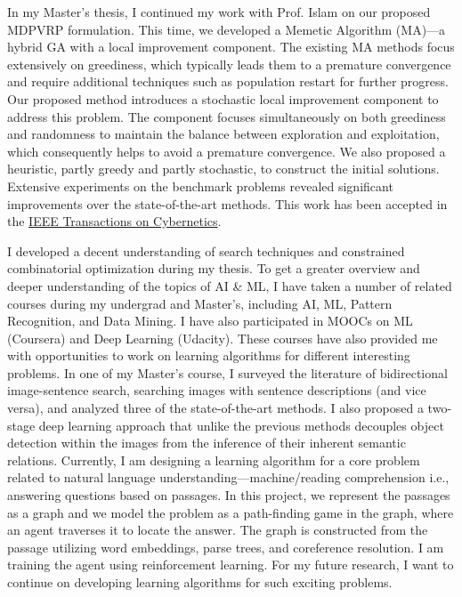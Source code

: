 \documentclass[12pt]{article}
\begin{document}
In my Master's thesis, I continued my work with Prof. Islam on our proposed MDPVRP formulation. This time, we developed a Memetic Algorithm (MA)---a hybrid GA with a local improvement component. The existing MA methods focus extensively on greediness, which typically leads them to a premature convergence and require additional techniques such as population restart for further progress. Our proposed method introduces a stochastic local improvement component to address this problem. The component focuses simultaneously on both greediness and randomness to maintain the balance between exploration and exploitation, which consequently helps to avoid a premature convergence. We also proposed a heuristic, partly greedy and partly stochastic, to construct the initial solutions. Extensive experiments on the benchmark problems revealed significant improvements over the state-of-the-art methods. This work has been accepted in the \href{http://ieeexplore.ieee.org/document/7835722/}{IEEE Transactions on Cybernetics}. 


I developed a decent understanding of search techniques and constrained combinatorial optimization during my thesis. To get a greater overview and deeper understanding of the topics of AI \& ML, I have taken a number of related courses during my undergrad and Master's, including AI, ML, Pattern Recognition, and Data Mining. I have also participated in MOOCs on ML (Coursera) and Deep Learning (Udacity). These courses have also provided me with opportunities to work on learning algorithms for different interesting problems. In one of my Master's course, I surveyed the literature of bidirectional image-sentence search, searching images with sentence descriptions (and vice versa), and analyzed three of the state-of-the-art methods. I also proposed a two-stage deep learning approach that unlike the previous methods decouples object detection within the images from the inference of their inherent semantic relations. Currently, I am designing a learning algorithm for a core problem related to natural language understanding---machine/reading comprehension i.e., answering questions based on passages. In this project, we represent the passages as a graph and we model the problem as a path-finding game in the graph, where an agent traverses it to locate the answer. The graph is constructed from the passage utilizing word embeddings, parse trees, and coreference resolution. I am training the agent using reinforcement learning. For my future research, I want to continue on developing learning algorithms for such exciting problems. 
\end{document}
